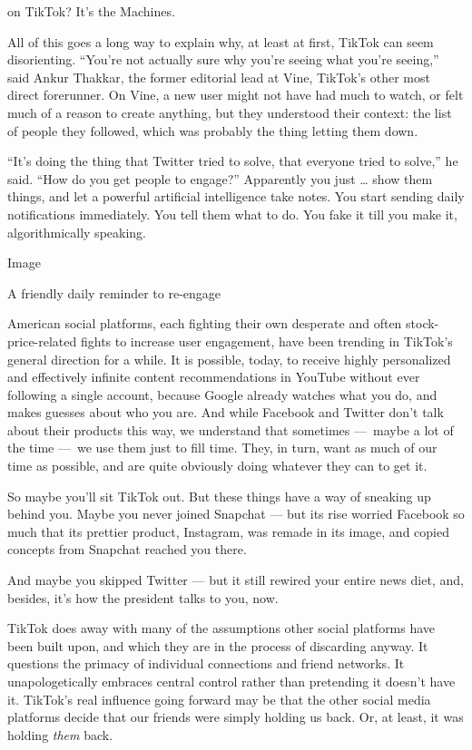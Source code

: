 on TikTok? It's the Machines.

All of this goes a long way to explain why, at least at first, TikTok
can seem disorienting. ``You're not actually sure why you're seeing what
you're seeing,'' said Ankur Thakkar, the former editorial lead at Vine,
TikTok's other most direct forerunner. On Vine, a new user might not
have had much to watch, or felt much of a reason to create anything, but
they understood their context: the list of people they followed, which
was probably the thing letting them down.

``It's doing the thing that Twitter tried to solve, that everyone tried
to solve,'' he said. ``How do you get people to engage?'' Apparently you
just \ldots{} show them things, and let a powerful artificial
intelligence take notes. You start sending daily notifications
immediately. You tell them what to do. You fake it till you make it,
algorithmically speaking.

Image

A friendly daily reminder to re-engage

American social platforms, each fighting their own desperate and often
stock-price-related fights to increase user engagement, have been
trending in TikTok's general direction for a while. It is possible,
today, to receive highly personalized and effectively infinite content
recommendations in YouTube without ever following a single account,
because Google already watches what you do, and makes guesses about who
you are. And while Facebook and Twitter don't talk about their products
this way, we understand that sometimes ---~maybe a lot of the time
---~we use them just to fill time. They, in turn, want as much of our
time as possible, and are quite obviously doing whatever they can to get
it.

So maybe you'll sit TikTok out. But these things have a way of sneaking
up behind you. Maybe you never joined Snapchat --- but its rise worried
Facebook so much that its prettier product, Instagram, was remade in its
image, and copied concepts from Snapchat reached you there.

And maybe you skipped Twitter --- but it still rewired your entire news
diet, and, besides, it's how the president talks to you, now.

TikTok does away with many of the assumptions other social platforms
have been built upon, and which they are in the process of discarding
anyway. It questions the primacy of individual connections and friend
networks. It unapologetically embraces central control rather than
pretending it doesn't have it. TikTok's real influence going forward may
be that the other social media platforms decide that our friends were
simply holding us back. Or, at least, it was holding \emph{them} back.

